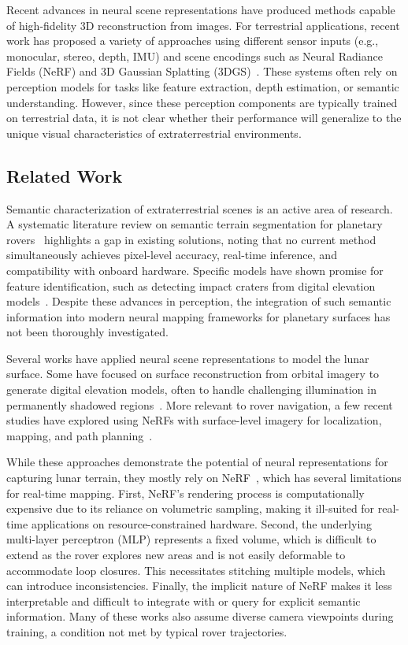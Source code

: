 Recent advances in neural scene representations have produced methods capable of high-fidelity 3D reconstruction from images. For terrestrial applications, recent work has proposed a variety of approaches using different sensor inputs (e.g., monocular, stereo, depth, IMU) and scene encodings such as Neural Radiance Fields (NeRF) and 3D Gaussian Splatting (3DGS)~\cite{tosi_how_2024}. These systems often rely on perception models for tasks like feature extraction, depth estimation, or semantic understanding. However, since these perception components are typically trained on terrestrial data, it is not clear whether their performance will generalize to the unique visual characteristics of extraterrestrial environments.

\subsection{Related Work}

Semantic characterization of extraterrestrial scenes is an active area of research. A systematic literature review on semantic terrain segmentation for planetary rovers~\cite{kuang_semantic_2022} highlights a gap in existing solutions, noting that no current method simultaneously achieves pixel-level accuracy, real-time inference, and compatibility with onboard hardware. Specific models have shown promise for feature identification, such as detecting impact craters from digital elevation models~\cite{jia_moon_2021}. Despite these advances in perception, the integration of such semantic information into modern neural mapping frameworks for planetary surfaces has not been thoroughly investigated.

Several works have applied neural scene representations to model the lunar surface. Some have focused on surface reconstruction from orbital imagery to generate digital elevation models, often to handle challenging illumination in permanently shadowed regions~\cite{van_kints_neural_2025, adams_summary_2023}. More relevant to rover navigation, a few recent studies have explored using NeRFs with surface-level imagery for localization, mapping, and path planning~\cite{huang_monocular_2025, hansen_analyzing_2024, dai_neural_2023, zhang_neural_2024}.

While these approaches demonstrate the potential of neural representations for capturing lunar terrain, they mostly rely on NeRF~\cite{mildenhall_nerf_2021}, which has several limitations for real-time mapping. First, NeRF's rendering process is computationally expensive due to its reliance on volumetric sampling, making it ill-suited for real-time applications on resource-constrained hardware. Second, the underlying multi-layer perceptron (MLP) represents a fixed volume, which is difficult to extend as the rover explores new areas and is not easily deformable to accommodate loop closures. This necessitates stitching multiple models, which can introduce inconsistencies. Finally, the implicit nature of NeRF makes it less interpretable and difficult to integrate with or query for explicit semantic information. Many of these works also assume diverse camera viewpoints during training, a condition not met by typical rover trajectories.

